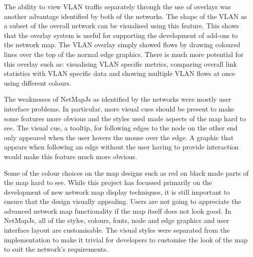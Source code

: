 \documentclass[11pt, a4paper]{article}
\begin{document}
The ability to view VLAN traffic separately through the use of overlays was
another advantage identified by both of the networks. The shape of the VLAN as a
subset of the overall network can be visualised using this feature. This shows
that the overlay system is useful for supporting the development of add-ons to
the network map. The VLAN overlay simply showed flows by drawing coloured lines
over the top of the normal edge graphics. There is much more potential for this
overlay such as: visualising VLAN specific metrics, comparing overall link
statistics with VLAN specific data and showing multiple VLAN flows at once using
different colours.

%
%
%
%
%
%

The weaknesses of NetMapJs as identified by the networks were mostly user
interface problems. In particular, more visual cues should be present to make
some features more obvious and the styles used made aspects of the map hard to
see. The visual cue, a tooltip, for following edges to the node on the other end
only appeared when the user hovers the mouse over the edge. A graphic that
appears when following an edge without the user having to provide interaction
would make this feature much more obvious. 

Some of the colour choices on the map designs such as red on black made parts of
the map hard to see. While this project has focussed primarily on the
development of new network map display techniques, it is still important to
ensure that the design visually appealing. Users are not going to appreciate the
advanced network map functionality if the map itself does not look good. In
NetMapJs, all of the styles, colours, fonts, node and edge graphics and user
interface layout are customisable. The visual styles were separated from the
implementation to make it trivial for developers to customise the look of the
map to suit the network's requirements.
\end{document}
